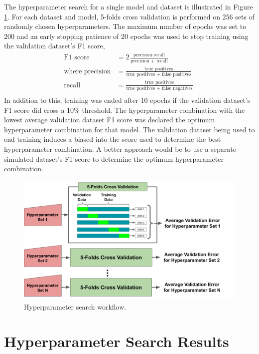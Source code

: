 The hyperparameter search for a single model and dataset is illustrated in Figure \ref{fig:hyperparameter_search_workflow}. For each dataset and model, 5-folds cross validation is performed on 256 sets of randomly chosen hyperparameters. The maximum number of epochs was set to 200 and an early stopping patience of 20 epochs was used to stop training using the validation dataset's F1 score,
%
\begin{align} \label{eq:f1_score}
\text{F1 score} &= 2 \frac{\text{precision} \cdot \text{recall}}{\text{precision + recall}} \\
\text{where precision} &= \frac{\text{true positives}}{\text{true positives + false positives}} \nonumber \\
\text{recall} &= \frac{\text{true positives}}{\text{true positives + false negatives}}. \nonumber \\
\end{align}
%
In addition to this, training was ended after 10 epochs if the validation dataset's F1 score did cross a 10\% threshold. The hyperparameter combination with the lowest average validation dataset F1 score was declared the optimum hyperparameter combination for that model. The validation dataset being used to end training induces a biased into the score used to determine the best hyperparameter combination. A better approach would be to use a separate simulated dataset's F1 score to determine the optimum hyperparameter combination.

\begin{figure}[H]
	\centering
	\includegraphics[trim=0 0 40 0,clip,width=1.0\linewidth]{images/hyperparameter_search_workflow}
	\caption{Hyperparameter search workflow.}
	\label{fig:hyperparameter_search_workflow}
\end{figure}

\section{Hyperparameter Search Results}

